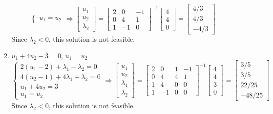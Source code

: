 \documentclass[letterpaper,12pt,titlepage]{article}
\begin{document}
\begin{enumerate}[leftmargin=0pt]
\begin{enumerate}
\[\begin{cases}
        u_1 = u_2
      \end{cases} \Longrightarrow
      \begin{bmatrix}
        u_1 \\ u_2 \\ \lambda_2
      \end{bmatrix} =
      \begin{bmatrix}
        2 & 0 & -1 \\
        0 & 4 & 1 \\
        1 & -1 & 0
      \end{bmatrix}^{-1}
      \begin{bmatrix}
        4 \\ 4 \\ 0
      \end{bmatrix} =
      \begin{bmatrix}
        4/3 \\ 4/3 \\ -4/3
      \end{bmatrix}
    \]
    Since $\lambda_2<0$, this solution is not feasible.
  \item $u_1+4u_2-3=0$, $u_1=u_2$
    \[ \begin{cases}
        2(u_1-2) + \lambda_1 - \lambda_2 = 0 \\
        4(u_2-1) + 4\lambda_1 + \lambda_2 = 0 \\
        u_1 + 4u_2 = 3 \\
        u_1 = u_2
      \end{cases} \Longrightarrow
      \begin{bmatrix}
        u_1 \\ u_2 \\ \lambda_1 \\ \lambda_2
      \end{bmatrix} =
      \begin{bmatrix}
        2 & 0 & 1 & -1 \\
        0 & 4 & 4 & 1 \\
        1 & 4 & 0 & 0 \\
        1 & -1 & 0 & 0
      \end{bmatrix}^{-1}
      \begin{bmatrix}
        4 \\ 4 \\ 3 \\ 0
      \end{bmatrix} =
      \begin{bmatrix}
        3/5 \\ 3/5 \\ 22/25 \\ -48/25
      \end{bmatrix}
    \]
    Since $\lambda_2<0$, this solution is not feasible.


\end{enumerate}
\end{enumerate}
\end{document}
